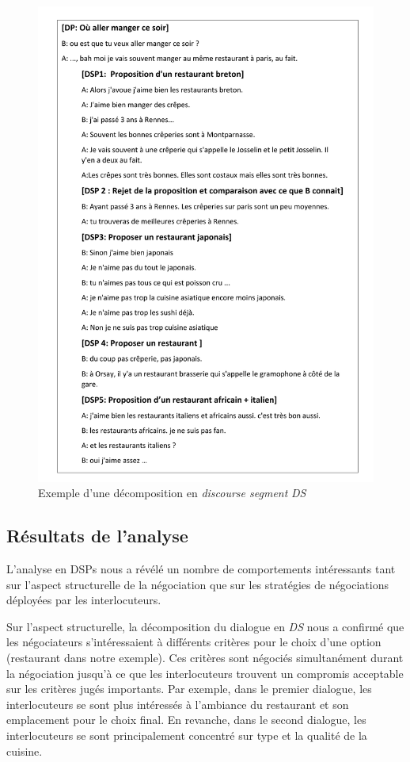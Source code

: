 			\begin{figure}
				\includegraphics[width=5in]{Figures/dsp_analysis.pdf}
				\caption{\label{fig:DSP} Exemple d'une décomposition en \emph{discourse segment} \emph{DS}}
			\end{figure} 
			 
		\subsection{Résultats de l'analyse}
		
			L'analyse en DSPs nous a révélé un nombre de comportements intéressants tant sur l'aspect structurelle de la négociation que sur les stratégies de négociations déployées par les interlocuteurs. 	
			
			Sur l'aspect structurelle, la décomposition du dialogue en \emph{DS} nous a confirmé que les négociateurs s'intéressaient à différents critères pour le choix d'une option (restaurant dans notre exemple). Ces critères sont négociés simultanément durant la négociation jusqu'à ce que les interlocuteurs trouvent un compromis acceptable sur les critères jugés importants. 
			Par exemple, dans le premier dialogue, les interlocuteurs se sont plus intéressés à l'ambiance du restaurant et son emplacement pour le choix final. En revanche, dans le second dialogue, les interlocuteurs se sont principalement concentré sur type et la qualité de la cuisine.
			    
